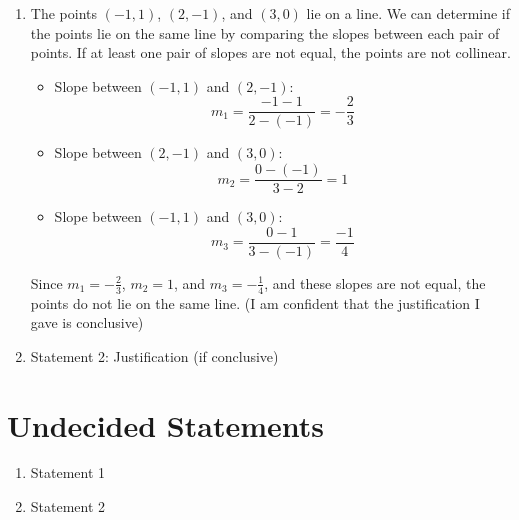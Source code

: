 \documentclass{article}
\begin{document}
\begin{enumerate}
    \item The points $(-1,1)$, $(2,-1)$, and $(3,0)$ lie on a line.\newline
          We can determine if the points lie on the same line by comparing the slopes between each pair of points.
          If at least one pair of slopes are not equal, the points are not collinear.

          \begin{itemize}
              \item Slope between \((-1, 1)\) and \((2, -1)\):
                    \[
                        m_1 = \frac{-1 - 1}{2 - (-1)} = -\frac{2}{3}
                    \]

              \item Slope between \((2, -1)\) and \((3, 0)\):
                    \[
                        m_2 = \frac{0 - (-1)}{3 - 2} = 1
                    \]

              \item Slope between \((-1, 1)\) and \((3, 0)\):
                    \[
                        m_3 = \frac{0 - 1}{3 - (-1)} = \frac{-1}{4}
                    \]
          \end{itemize}

          Since \(m_1 = -\frac{2}{3}\), \(m_2 = 1\), and \(m_3 = -\frac{1}{4}\), and these slopes are not equal, the points do not lie on the same line. (I am confident that the justification I gave is conclusive)
    \item Statement 2: Justification (if conclusive)
\end{enumerate}

\section{Undecided Statements}

\begin{enumerate}
    \item Statement 1
    \item Statement 2
\end{enumerate}
\end{document}
